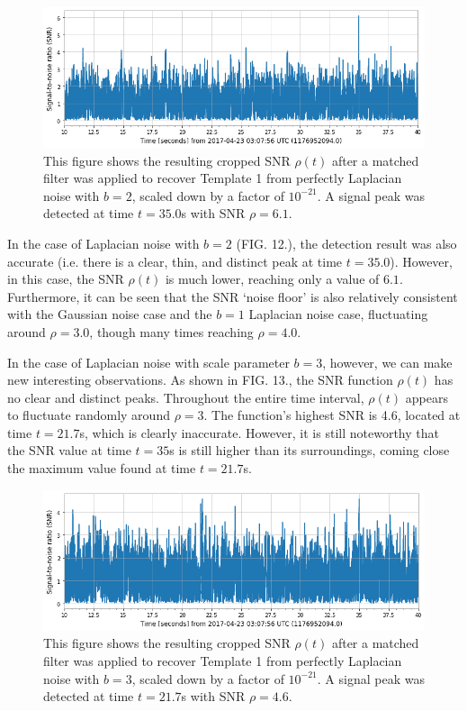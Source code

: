 \documentclass[preprint,
letterpaper,
 amsmath,amssymb,
 aps,
]{revtex4-2}
\begin{document}
\begin{figure}[t]
\caption{This figure shows the resulting cropped SNR $\rho(t)$ after a matched filter was applied to recover Template 1 from perfectly Laplacian noise with $b=2$, scaled down by a factor of $10^{-21}$. A signal peak was detected at time $t = 35.0$s with SNR $\rho = 6.1$.}
\includegraphics[scale = .33]{laplacian b=2 template 1.png}
\centering
\end{figure} 
In the case of Laplacian noise with $b=2$ (FIG. 12.), the detection result was also accurate (i.e. there is a clear, thin, and distinct peak at time $t=35.0$). However, in this case, the SNR $\rho(t)$ is much lower, reaching only a value of $6.1$. Furthermore, it can be seen that the SNR `noise floor' is also relatively consistent with the Gaussian noise case and the $b=1$ Laplacian noise case, fluctuating around $\rho = 3.0$, though many times reaching $\rho = 4.0$.

In the case of Laplacian noise with scale parameter $b=3$, however, we can make new interesting observations. As shown in FIG. 13., the SNR function $\rho(t)$ has no clear and distinct peaks. Throughout the entire time interval, $\rho(t)$ appears to fluctuate randomly around $\rho = 3$. The function's highest SNR is 4.6, located at time $t=21.7$s, which is clearly inaccurate. However, it is still noteworthy that the SNR value at time $t=35$s is still higher than its surroundings, coming close the maximum value found at time $t=21.7$s.

\begin{figure}[t]
\caption{This figure shows the resulting cropped SNR $\rho(t)$ after a matched filter was applied to recover Template 1 from perfectly Laplacian noise with $b=3$, scaled down by a factor of $10^{-21}$. A signal peak was detected at time $t = 21.7$s with SNR $\rho = 4.6$.}
\includegraphics[scale = .33]{laplacian b=3 template 1.png}
\centering
\end{figure}
\end{document}
